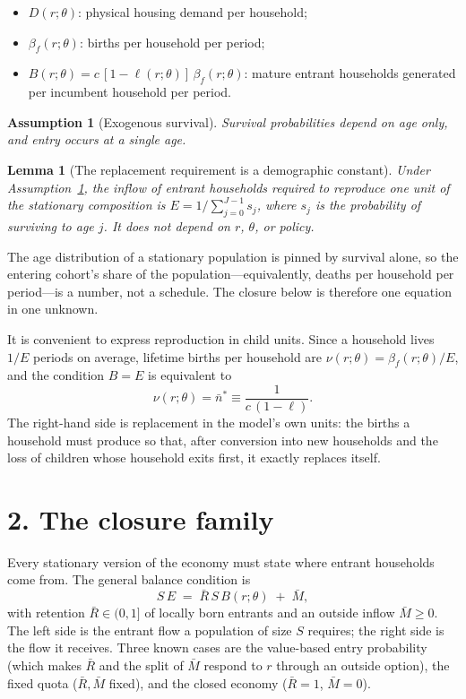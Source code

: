\documentclass[11pt]{article}
\newtheorem{assumption}{Assumption}
\newtheorem{lemma}{Lemma}
\theoremstyle{definition}
\begin{document}
\begin{itemize}
\item $D(r;\theta)$: physical housing demand per household;
\item $\beta_f(r;\theta)$: births per household per period;
\item $B(r;\theta)=c\,[1-\ell(r;\theta)]\,\beta_f(r;\theta)$: mature entrant
households generated per incumbent household per period.
\end{itemize}

\begin{assumption}[Exogenous survival]\label{ass:surv}
Survival probabilities depend on age only, and entry occurs at a single age.
\end{assumption}

\begin{lemma}[The replacement requirement is a demographic constant]\label{lem:E}
Under Assumption~\ref{ass:surv}, the inflow of entrant households required to
reproduce one unit of the stationary composition is
$E=1/\sum_{j=0}^{J-1} s_j$, where $s_j$ is the probability of surviving to age
$j$. It does not depend on $r$, $\theta$, or policy.
\end{lemma}

The age distribution of a stationary population is pinned by survival alone,
so the entering cohort's share of the population---equivalently, deaths per
household per period---is a number, not a schedule. The closure below is
therefore one equation in one unknown.

It is convenient to express reproduction in child units. Since a household
lives $1/E$ periods on average, lifetime births per household are
$\nu(r;\theta)=\beta_f(r;\theta)/E$, and the condition $B=E$ is equivalent to
\begin{equation}
\nu(r;\theta)=\bar n^{*}\equiv\frac{1}{c\,(1-\ell)} .
\label{eq:replacement_units}
\end{equation}
The right-hand side is replacement in the model's own units: the births a
household must produce so that, after conversion into new households and the
loss of children whose household exits first, it exactly replaces itself.

\section*{2. The closure family}

Every stationary version of the economy must state where entrant households
come from. The general balance condition is
\begin{equation}
S\,E \;=\; \bar R\,S\,B(r;\theta)\;+\;\bar M ,
\label{eq:family}
\end{equation}
with retention $\bar R\in(0,1]$ of locally born entrants and an outside inflow
$\bar M\ge0$. The left side is the entrant flow a population of size $S$
requires; the right side is the flow it receives. Three known cases are the
value-based entry probability (which makes $\bar R$ and the split of
$\bar M$ respond to $r$ through an outside option), the fixed quota
($\bar R,\bar M$ fixed), and the closed economy ($\bar R=1$, $\bar M=0$).
\end{document}
